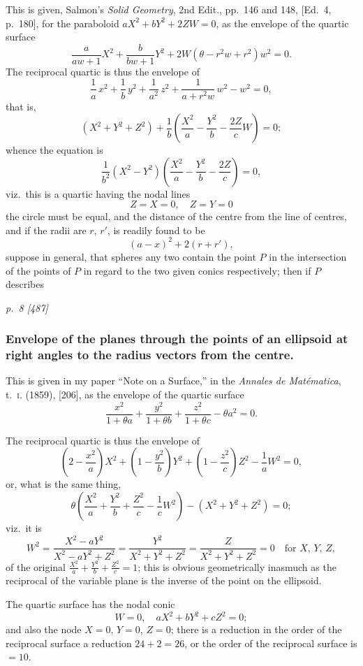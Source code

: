 \documentclass[11pt,a4paper]{article}
\theoremstyle{plain}
\theoremstyle{definition}
\begin{document}
This is given, Salmon's \textit{Solid Geometry}, 2nd Edit., pp.\ 146 and 148, [Ed.\ 4, p.\ 180],
for the paraboloid $aX^2 + bY^2 + 2Z W = 0$, as the envelope of the quartic surface
\[
\frac{a}{aw + 1} X^2 + \frac{b}{bw + 1} Y^2 + 2W(\theta - r^2 w + r^2) w^2 = 0.
\]
The reciprocal quartic is thus the envelope of
\[
\frac{1}{a} \, x^2 + \frac{1}{b} \, y^2 + \frac{1}{a^2} \, z^2 + \frac{1}{a + r^2 w} \, w^2 - w^2 = 0,
\]
that is,
\[
(X^2 + Y^2 + Z^2) + \frac{1}{b}\left(\frac{X^2}{a} - \frac{Y^2}{b} - \frac{2Z}{c}W\right) = 0;
\]
whence the equation is
\[
\frac{1}{b^2}(X^2 - Y^2)\left(\frac{X^2}{a} - \frac{Y^2}{b} - \frac{2Z}{c}\right) = 0,
\]
viz.\ this is a quartic having the nodal lines
\[
Z = X = 0, \quad Z = Y = 0
\]
the circle must be equal, and the distance of the centre from the line of centres, and if the radii are $r$, $r'$, is readily found to be
\[
(a - x)^2 + 2(r + r'),
\]
suppose in general, that spheres any two contain the point $P$ in the intersection of the points of $P$ in regard to the two given conics respectively; then if $P$ describes

\clearpage

\bigskip
\textit{p.~8 [487]}
\smallskip

\subsubsection*{Envelope of the planes through the points of an ellipsoid at right angles to the radius vectors from the centre.}

This is given in my paper ``Note on a Surface,'' in the \textit{Annales de Mat\'ematica},
t.~\textsc{i.} (1859), [206], as the envelope of the quartic surface
\[
\frac{x^2}{1+\theta a} + \frac{y^2}{1+\theta b} + \frac{z^2}{1+\theta c} - \theta a^2 = 0.
\]

The reciprocal quartic is thus the envelope of
\[
\left(2 - \frac{x^2}{a}\right)X^2 + \left(1 - \frac{y^2}{b}\right)Y^2 + \left(1 - \frac{z^2}{c}\right)Z^2 - \frac{1}{a}W^2 = 0,
\]
or, what is the same thing,
\[
\theta\left(\frac{X^2}{a} + \frac{Y^2}{b} + \frac{Z^2}{c} - \frac{1}{c}W^2\right) - (X^2 + Y^2 + Z^2) = 0;
\]
viz.\ it is
\[
W^2 = \frac{X^2 - aY^2}{X^2 - aY^2 + Z^2} = \frac{Y^2}{X^2 + Y^2 + Z^2} = \frac{Z}{X^2 + Y^2 + Z^2} = 0 \quad \text{for } X, \, Y, \, Z,
\]
of the original $\frac{X^2}{a} + \frac{Y^2}{b} + \frac{Z^2}{c} = 1$; this is obvious geometrically inasmuch as the
reciprocal of the variable plane is the inverse of the point on the ellipsoid.

The quartic surface has the nodal conic
\[
W = 0, \quad aX^2 + bY^2 + cZ^2 = 0;
\]
and also the node $X = 0$, $Y = 0$, $Z = 0$; there is a reduction in the order of the
reciprocal surface a reduction $24 + 2 = 26$, or the order of the reciprocal surface is $= 10$.
\end{document}
